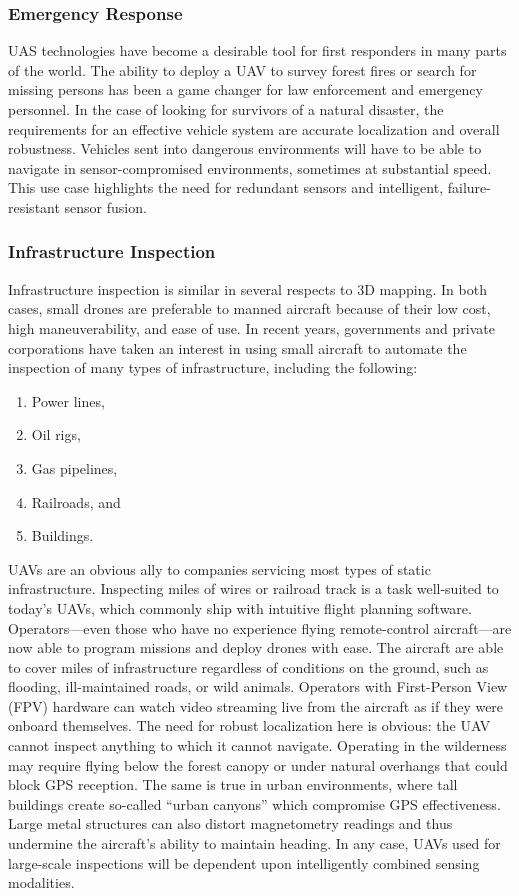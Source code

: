 \subsubsection{Emergency Response}

UAS technologies have become a desirable tool for first responders in many parts of the world. The ability to deploy a UAV to survey forest fires or search for missing persons has been a game changer for law enforcement and emergency personnel. In the case of looking for survivors of a natural disaster, the requirements for an effective vehicle system are accurate localization and overall robustness. Vehicles sent into dangerous environments will have to be able to navigate in sensor-compromised environments, sometimes at substantial speed. This use case highlights the need for redundant sensors and intelligent, failure-resistant sensor fusion.

\subsubsection{Infrastructure Inspection}

Infrastructure inspection is similar in several respects to 3D mapping. In both cases, small drones are preferable to manned aircraft because of their low cost, high maneuverability, and ease of use. In recent years, governments and private corporations have taken an interest in using small aircraft to automate the inspection of many types of infrastructure, including the following:
\begin{enumerate}
    \item Power lines,
    \item Oil rigs,
    \item Gas pipelines,
    \item Railroads, and
    \item Buildings.
\end{enumerate}
UAVs are an obvious ally to companies servicing most types of static infrastructure. Inspecting miles of wires or railroad track is a task well-suited to today's UAVs, which commonly ship with intuitive flight planning software. Operators---even those who have no experience flying remote-control aircraft---are now able to program missions and deploy drones with ease. The aircraft are able to cover miles of infrastructure regardless of conditions on the ground, such as flooding, ill-maintained roads, or wild animals. Operators with First-Person View (FPV) hardware can watch video streaming live from the aircraft as if they were onboard themselves. The need for robust localization here is obvious: the UAV cannot inspect anything to which it cannot navigate. Operating in the wilderness may require flying below the forest canopy or under natural overhangs that could block GPS reception. The same is true in urban environments, where tall buildings create so-called ``urban canyons'' which compromise GPS effectiveness. Large metal structures can also distort magnetometry readings and thus undermine the aircraft's ability to maintain heading. In any case, UAVs used for large-scale inspections will be dependent upon intelligently combined sensing modalities.

